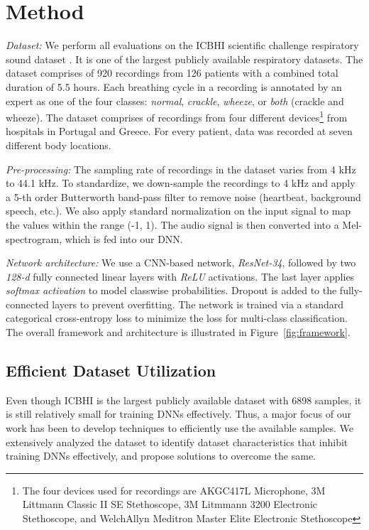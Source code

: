 \documentclass{article}
\begin{document}
\section{Method}
\label{sec:method}
\vspace{-2mm}
\noindent\textit{Dataset:} We perform all evaluations on the ICBHI scientific challenge respiratory sound dataset \cite{icbhi_17, icbhi_19}. It is one of the largest publicly available respiratory datasets. The dataset comprises of 920 recordings from 126 patients with a combined total duration of 5.5 hours. Each breathing cycle in a recording is annotated by an expert as one of the four classes: \textit{normal}, \textit{crackle}, \textit{wheeze}, or \textit{both} (crackle and wheeze). The dataset comprises of recordings from four different devices\footnote{The four devices used for recordings are AKGC417L Microphone, 3M Littmann Classic II SE Stethoscope, 3M Litmmann 3200 Electronic Stethoscope, and WelchAllyn Meditron Master Elite Electronic Stethoscope} from hospitals in Portugal and Greece. For every patient, data was recorded at seven different body locations.

\smallskip\noindent\textit{Pre-processing:} The sampling rate of recordings in the dataset varies from 4 kHz to 44.1 kHz. To standardize, we down-sample the recordings to 4 kHz and apply a 5-th order Butterworth band-pass filter to remove noise (heartbeat, background speech, etc.). We also apply standard normalization on the input signal to map the values within the range (-1, 1). The audio signal is then converted into a Mel-spectrogram, which is fed into our DNN.

\smallskip\noindent\textit{Network architecture:} We use a CNN-based network, \textit{ResNet-34}, followed by two \textit{128-d} fully connected linear layers with \textit{ReLU} activations. The last layer applies \textit{softmax activation} to model classwise probabilities. Dropout is added to the fully-connected layers to prevent overfitting. The network is trained via a standard categorical cross-entropy loss to minimize the loss for multi-class classification. The overall framework and architecture is illustrated in Figure~\ref{fig:framework}.

\vspace{-2mm}
\subsection{Efficient Dataset Utilization}
\vspace{-2mm}
Even though ICBHI is the largest publicly available dataset with 6898 samples, it is still relatively small for training DNNs effectively. Thus, a major focus of our work has been to develop techniques to efficiently use the available samples. We extensively analyzed the dataset to identify dataset characteristics that inhibit training DNNs effectively, and propose solutions to overcome the same.
\end{document}
